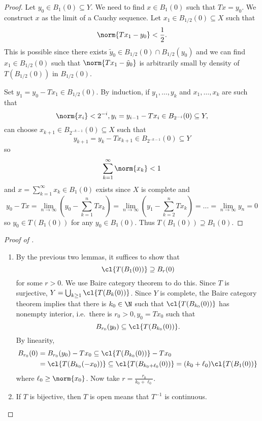 \documentclass[a4paper]{article}
\begin{document}
\begin{proof}
  Let \(y_0 \in B_1(0) \subseteq Y\). We need to find \(x \in B_1(0)\) such that \(Tx = y_0\). We construct \(x\) as the limit of a Cauchy sequence. Let \(x_1 \in B_{1/2}(0) \subseteq X\) such that
  \[
    \norm{Tx_1 - y_0} < \frac{1}{2}.
  \]
  This is possible since there exists \(\tilde y_0 \in B_{1/2}(0) \cap B_{1/2}(y_0)\) and we can find \(x_1 \in B_{1/2}(0)\) such that \(\norm{Tx_1 - \tilde y_0}\) is arbitrarily small by density of \(T(B_{1/2}(0))\) in \(B_{1/2}(0)\).

  Set \(y_1 = y_0 - Tx_1 \in B_{1/2}(0)\). By induction, if \(y_1, \dots, y_k\) and \(x_1, \dots, x_k\) are such that
  \[
    \norm{x_i} < 2^{-i}, y_i = y_{i - 1} - Tx_i \in B_{2^{-i}}(0) \subseteq Y,
  \]
  can choose \(x_{k + 1} \in B_{2^{-k - 1}}(0) \subseteq X\) such that
  \[
    y_{k + 1} = y_k - Tx_{k + 1} \in B_{2^{-k - 1}}(0) \subseteq Y
  \]
  so
  \[
    \sum_{k = 1}^\infty \norm{x_k} < 1
  \]
  and \(x = \sum_{k = 1}^\infty x_k \in B_1(0)\) exists since \(X\) is complete and
  \[
    y_0 - Tx = \lim_{n \to \infty} \left( y_0 - \sum_{k = 1}^n Tx_k \right)
    = \lim_{n \to \infty} \left( y_1 - \sum_{k = 2}^n Tx_k \right)
    = \dots
    = \lim_{n \to \infty} y_n
    = 0
  \]
  so \(y_0 \in T(B_1(0))\) for any \(y_0 \in B_1(0)\). Thus \(T(B_1(0)) \supseteq B_1(0)\).
\end{proof}

\begin{proof}[Proof of ]\leavevmode
  \begin{enumerate}
  \item By the previous two lemmas, it suffices to show that
    \[
      \cl{T(B_1(0))} \supseteq B_r(0)
    \]
    for some \(r > 0\). We use Baire category theorem to do this. Since \(T\) is surjective, \(Y = \bigcup_{k \geq 1} \cl{T(B_k(0))}\). Since \(Y\) is complete, the Baire category theorem implies that there is \(k_0 \in \N\) such that \(\cl{T(B_{k_0}(0))}\) has nonempty interior, i.e.\ there is \(r_0 > 0, y_0 = Tx_0\) such that
    \[
      B_{r_0}(y_0) \subseteq \cl{T(B_{k_0}(0))}.
    \]
    By linearity,
    \begin{align*}
      B_{r_0}(0)
      &= B_{r_0}(y_0) - Tx_0 \subseteq \cl{T(B_{k_0}(0))} - Tx_0 \\
      &= \cl{T(B_{k_0}(-x_0))} \subseteq \cl{T(B_{k_0 + \ell_0}(0))} = (k_0 + \ell_0) \cl{T(B_1(0))}
    \end{align*}
    where \(\ell_0 \geq \norm{x_0}\). Now take \(r = \frac{r_0}{k_0 + \ell_0}\).
  \item If \(T\) is bijective, then \(T\) is open means that \(T^{-1}\) is continuous.
  \end{enumerate}
\end{proof}
\end{document}
